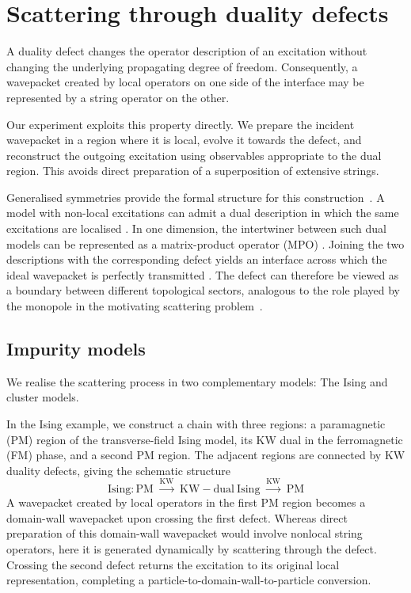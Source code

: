 \documentclass[aps,floatfix,10pt,amssymb,amsfont,amsmath,superscriptaddress,float,nofootinbib,longbibliography,nobalancelastpage,twocolumn]{revtex4-2}
\begin{document}
\section{Scattering through duality defects}
\label{section:nonlocalwavepacket}
A duality defect changes the operator description of an excitation without changing the underlying propagating degree of freedom. Consequently, a wavepacket created by local operators on one side of the interface may be represented by a string operator on the other. 

Our experiment exploits this property directly. We prepare the incident wavepacket in a region where it is local, evolve it towards the defect, and reconstruct the outgoing excitation using observables appropriate to the dual region. This avoids direct preparation of a superposition of extensive strings.

Generalised symmetries provide the formal structure for this construction~\cite{shao2023noninvertible}. A model with non-local excitations can admit a dual description in which the same excitations are localised \cite{lootens2025entanglement}. In one dimension, the intertwiner between such dual models can be represented as a matrix-product operator (MPO) \cite{lootens2023dualities, lootens2024dualities}. Joining the two descriptions with the corresponding defect yields an interface across which the ideal wavepacket is perfectly transmitted \cite{ueda2025}. The defect can therefore be viewed as a boundary between different topological sectors, analogous to the role played by the monopole in the motivating scattering problem~\cite{khan2024quantumoperations}.

\subsection{Impurity models}
We realise the scattering process in two complementary models: The Ising and cluster models. 

In the Ising example, we construct a chain with three regions: a paramagnetic (PM) region of the transverse-field Ising model, its KW dual in the ferromagnetic (FM) phase, and a second PM region. The adjacent regions are connected by KW duality defects, giving the schematic structure
$$\text{Ising:}\,\mathrm{PM} \;\xrightarrow{\mathrm{KW}}\; \mathrm{KW-dual\ Ising} \;\xrightarrow{\mathrm{KW}}\; \mathrm{PM} $$
A wavepacket created by local operators in the first PM region becomes a domain-wall wavepacket upon crossing the first defect. Whereas direct preparation of this domain-wall wavepacket would involve nonlocal string operators, here it is generated dynamically by scattering through the defect. Crossing the second defect returns the excitation to its original local representation, completing a particle-to-domain-wall-to-particle conversion.
\end{document}
